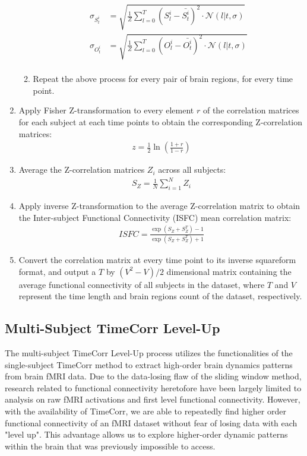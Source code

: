 \documentclass[12pt]{article}
\begin{document}
\begin{enumerate}
\begin{enumerate}
\begin{align*}
\sigma_{S_t^i} &=\sqrt{ \frac{1}{Z}\sum_{l=0}^T (S_l^i-\bar{S_t^i})^2 \cdot \mathcal{N}(l|t,\sigma)}\\
\sigma_{O_t^i} &=\sqrt{ \frac{1}{Z}\sum_{l=0}^T (O_l^i-\bar{O_t^i})^2 \cdot \mathcal{N}(l|t,\sigma)}\\
\end{align*}
\item Repeat the above process for every pair of brain regions, for every time point.
\end{enumerate}
\item Apply Fisher Z-transformation to every element $r$ of the correlation matrices for each subject at each time points to obtain the corresponding Z-correlation matrices:
\begin{align*}
z = \frac{1}{2}\ln(\frac{1+r}{1-r})
\end{align*}
\item Average the Z-correlation matrices $Z_i$ across all subjects:
\begin{align*}
S_Z = \frac{1}{N}\sum^N_{i=1}Z_i
\end{align*}
\item Apply inverse Z-transformation to the average Z-correlation matrix to obtain the Inter-subject Functional Connectivity (ISFC) mean correlation matrix:
\begin{align*}
ISFC = \frac{\exp(S_Z+S_Z^T)-1}{\exp(S_Z+S_Z^T)+1}
\end{align*}
\item Convert the correlation matrix at every time point to its inverse squareform format, and output a $T$ by $(V^2-V)/2$ dimensional matrix containing the average functional connectivity of all subjects in the dataset, where $T$ and $V$ represent the time length and brain regions count of the dataset, respectively.
\end{enumerate}

\subsection{Multi-Subject TimeCorr Level-Up}
The multi-subject TimeCorr Level-Up process utilizes the functionalities of the single-subject TimeCorr method to extract high-order brain dynamics patterns from brain fMRI data. Due to the data-losing flaw of the sliding window method, research related to functional connectivity heretofore have been largely limited to analysis on raw fMRI activations and first level functional connectivity. However, with the availability of TimeCorr, we are able to repeatedly find higher order functional connectivity of an fMRI dataset without fear of losing data with each "level up". This advantage allows us to explore higher-order dynamic patterns within the brain that was previously impossible to access.
\end{document}
